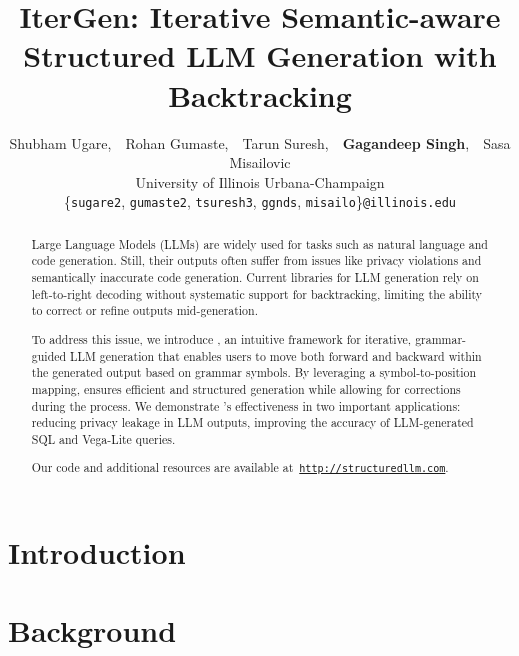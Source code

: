 \documentclass{article}
\title{IterGen: Iterative Semantic-aware Structured LLM Generation with Backtracking}
\author{Shubham Ugare,\ \ Rohan Gumaste,\ \ Tarun Suresh,\ \ \textbf{Gagandeep Singh},\ \ Sasa Misailovic  \\
University of Illinois Urbana-Champaign\\
\{\texttt{sugare2}, \texttt{gumaste2}, \texttt{tsuresh3}, \texttt{ggnds}, \texttt{misailo}\}\texttt{@illinois.edu} \\
}
\begin{document}
\maketitle


\begin{abstract}

Large Language Models (LLMs) are widely used for tasks such as natural language and code generation. Still, their outputs often suffer from issues like privacy violations and semantically inaccurate code generation. 
Current libraries for LLM generation rely on left-to-right decoding without systematic support for backtracking, limiting the ability to correct or refine outputs mid-generation. 

To address this issue, we introduce \Tool{}, an intuitive framework for iterative, grammar-guided LLM generation that enables users to move both forward and backward within the generated output based on grammar symbols. 
By leveraging a symbol-to-position mapping, \Tool{} ensures efficient and structured generation while allowing for corrections during the process. 
We demonstrate \Tool{}'s effectiveness in two important applications: reducing privacy leakage in LLM outputs, improving the accuracy of LLM-generated SQL and Vega-Lite queries.

\vspace{0.1in}
Our code and additional resources are available at~{\color{blue}\tt\footnotesize\href{https://structuredllm.com}{http://structuredllm.com}}.



\end{abstract}

\vspace{-.02in}
\section{Introduction}
\label{intro}


\vspace{-.05in}
\section{Background}

\end{document}
